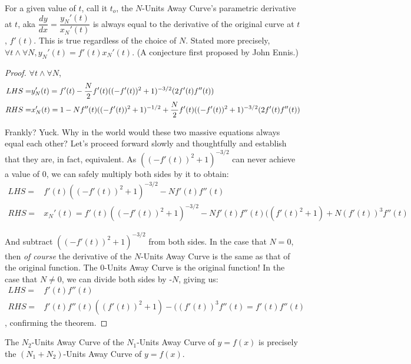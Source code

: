 \begin{theorem}

  For a given value of $t$, call it $t_o$, the $N$-Units Away Curve’s parametric derivative at $t$, aka $\dfrac{dy}{dx} = \dfrac{y_N'(t)}{x_N'(t)}$ is always equal to the derivative of the original curve at $t$, $f'(t)$. This is true regardless of the choice of $N$. Stated more precisely, $\forall t \land \forall N, y_N'(t) = f'(t) x_N'(t)$. (A conjecture first proposed by John Ennis.)

\end{theorem}

\begin{proof}

  $\forall t \land \forall N$,
  \begin{align*}
    LHS = & y_N'(t) = f'(t) - \dfrac{N}{2} f'(t) ((-f'(t))^2 + 1) ^ {-3/2} (2 f'(t) f''(t)) \\
    RHS = & x_N'(t) = 1 - N f''(t) ((-f'(t))^2 + 1)^{-1/2} + \dfrac{N}{2} f'(t) ( (-f'(t))^2 + 1) ^ {-3/2} (2 f'(t) f''(t))
  \end{align*}

  Frankly? Yuck. Why in the world would these two massive equations always equal each other? Let’s proceed forward slowly and thoughtfully and establish that they are, in fact, equivalent. As $((-f'(t))^2 + 1) ^ {-3/2}$ can never achieve a value of 0, we can safely multiply both sides by it to obtain:
  \begin{align*}
    LHS = & f'(t) ((-f'(t))^2 + 1) ^ {-3/2} - N f'(t) f''(t) \\
    RHS = & x_N'(t) = f'(t) ((-f'(t))^2 + 1) ^ {-3/2} - N f'(t) f''(t) ((f'(t) ^ 2 + 1) + N (f'(t))^3 f''(t)
  \end{align*}

  And subtract $((-f'(t))^2 + 1) ^ {-3/2}$ from both sides. In the case that $N = 0$, then \textit{of course} the derivative of the $N$-Units Away Curve is the same as that of the original function. The $0$-Units Away Curve is the original function! In the case that $N \neq 0$, we can divide both sides by -$N$, giving us:
  \begin{align*}
    LHS = & f'(t)f''(t) \\
    RHS = & f'(t)f''(t) ((f'(t))^2 + 1) - ((f'(t))^3 f''(t) = f'(t)f''(t)
  \end{align*}, confirming the theorem.

\end{proof}

\begin{theorem}

  The $N_2$-Units Away Curve of the $N_1$-Units Away Curve of $y = f(x)$ is precisely the $(N_1 + N_2)$-Units Away Curve of $y = f(x)$.

\end{theorem}

